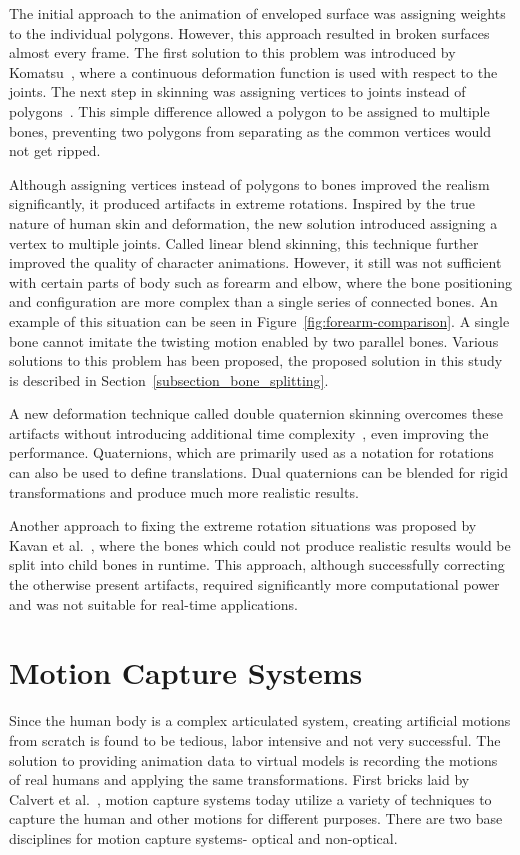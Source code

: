 The initial approach to the animation of enveloped surface was assigning weights to the individual polygons. However, this approach resulted in broken surfaces almost every frame. The first solution to this problem was introduced by Komatsu~\cite{Komatsu1988}, where a continuous deformation function is used with respect to the joints. The next step in skinning was assigning vertices to joints instead of polygons~\cite{Lander1988}. This simple difference allowed a polygon to be assigned to multiple bones, preventing two polygons from separating as the common vertices would not get ripped.

Although assigning vertices instead of polygons to bones improved the realism significantly, it produced artifacts in extreme rotations. Inspired by the true nature of human skin and deformation, the new solution introduced assigning a vertex to multiple joints. Called linear blend skinning, this technique further improved the quality of character animations. However, it still was not sufficient with certain parts of body such as forearm and elbow, where the bone positioning and configuration are more complex than a single series of connected bones. An example of this situation can be seen in Figure~\ref{fig:forearm-comparison}.
A single bone cannot imitate the twisting motion enabled by two parallel bones. Various solutions to this problem has been proposed, the proposed solution in this study is described in Section~\ref{subsection_bone_splitting}. 

A new deformation technique called double quaternion skinning overcomes these artifacts without introducing additional time complexity~\cite{Kavan2007}, even improving the performance. Quaternions, which are primarily used as a notation for rotations can also be used to define translations. Dual quaternions can be blended for rigid transformations and produce much more realistic results.

Another approach to fixing the extreme rotation situations was proposed by Kavan et al.~\cite{Kavan2009}, where the bones which could not produce realistic results would be split into child bones in runtime. This approach, although successfully correcting the otherwise present artifacts, required significantly more computational power and was not suitable for real-time applications. 


\section{Motion Capture Systems}
\label{section_related_mocap}
Since the human body is a complex articulated system, creating artificial motions from scratch is found to be tedious, labor intensive and not very successful. The solution to providing animation data to virtual models is recording the motions of real humans and applying the same transformations. First bricks laid by Calvert et al.~\cite{Calvert1982}, motion capture systems today utilize a variety of techniques to capture the human and other motions for different purposes. There are two base disciplines for motion capture systems- optical and non-optical.
 

